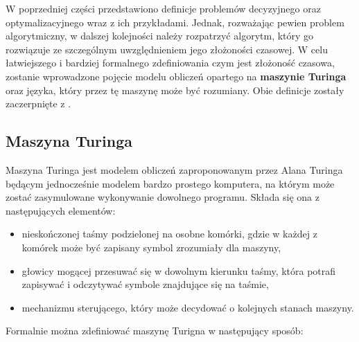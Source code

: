 W poprzedniej części przedstawiono definicje problemów decyzyjnego oraz optymalizacyjnego wraz z ich przykładami. Jednak, rozważając pewien problem algorytmiczny, w dalszej kolejności należy rozpatrzyć algorytm, który go rozwiązuje ze szczególnym uwzględnieniem jego złożoności czasowej. W celu łatwiejszego i bardziej formalnego zdefiniowania czym jest złożoność czasowa, zostanie wprowadzone pojęcie modelu obliczeń opartego na \textbf{maszynie Turinga} oraz języka, który przez tę maszynę może być rozumiany. Obie definicje zostały zaczerpnięte z \cite{WazniakZlozonosc}.

\subsection{Maszyna Turinga}

Maszyna Turinga jest modelem obliczeń zaproponowanym przez Alana Turinga będącym jednocześnie modelem bardzo prostego komputera, na którym może zostać zasymulowane wykonywanie dowolnego programu. Składa się ona z następujących elementów:
\begin{itemize}
    \item nieskończonej taśmy podzielonej na osobne komórki, gdzie w każdej z komórek może być zapisany symbol zrozumiały dla maszyny, 
    \item głowicy mogącej przesuwać się w dowolnym kierunku taśmy, która potrafi zapisywać i odczytywać symbole znajdujące się na taśmie, 
    \item mechanizmu sterującego, który może decydować o kolejnych stanach maszyny.
\end{itemize}
Formalnie można zdefiniować maszynę Turigna w następujący sposób:

